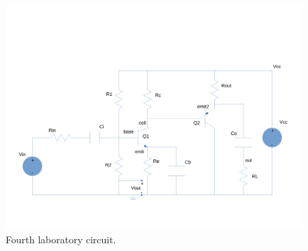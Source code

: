 \begin{figure}[h] \centering
\includegraphics[width=0.8\linewidth]{circuit.pdf}
\caption{Fourth laboratory circuit.}
\label{fig:circuit}
\end{figure}

\pagebreak

